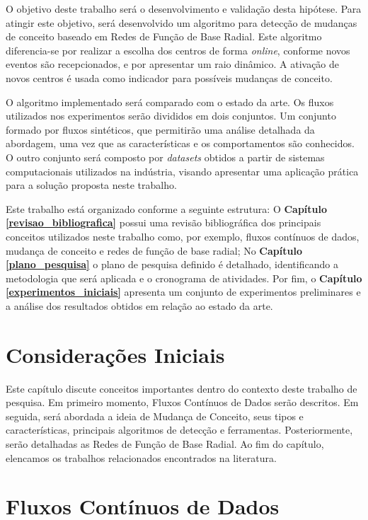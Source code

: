 \documentclass[qual, classic, a4paper]{ufbathesis}
\begin{document}
O objetivo deste trabalho será o desenvolvimento e validação desta hipótese.
Para atingir este objetivo, será desenvolvido um algoritmo para detecção de mudanças de conceito baseado em Redes de Função de Base Radial. 
Este algoritmo diferencia-se por realizar a escolha dos centros de forma \textit{online}, conforme novos eventos são recepcionados, 
e por apresentar um raio dinâmico. 
A ativação de novos centros é usada como indicador para possíveis mudanças de conceito.

O algoritmo implementado será comparado com o estado da arte. 
Os fluxos utilizados nos experimentos serão divididos em dois conjuntos. 
Um conjunto formado por fluxos sintéticos, que permitirão uma análise detalhada da abordagem, uma vez que as características e os comportamentos são conhecidos. 
O outro conjunto será composto por \textit{datasets} obtidos a partir de sistemas computacionais utilizados na indústria,
visando apresentar uma aplicação prática para a solução proposta neste trabalho.


Este trabalho está organizado conforme a seguinte estrutura: 
O \textbf{Capítulo \ref{revisao_bibliografica}} possui uma revisão bibliográfica dos principais conceitos utilizados neste trabalho como, 
por exemplo, fluxos contínuos de dados, mudança de conceito e redes de função de base radial; 
No \textbf{Capítulo \ref{plano_pesquisa}} o plano de pesquisa definido é detalhado, 
identificando a metodologia que será aplicada e o cronograma de atividades. 
Por fim, o \textbf{Capítulo \ref{experimentos_iniciais}} 
apresenta um conjunto de experimentos preliminares e a análise dos resultados obtidos em relação ao estado da arte.

 \label{revisao_bibliografica}
\section{Considerações Iniciais}

Este capítulo discute conceitos importantes dentro do contexto deste trabalho de pesquisa.
Em primeiro momento, Fluxos Contínuos de Dados serão descritos.
Em seguida, será abordada a ideia de Mudança de Conceito, seus tipos e características, principais algoritmos de detecção e ferramentas.
Posteriormente, serão detalhadas as Redes de Função de Base Radial.
Ao fim do capítulo, elencamos os trabalhos relacionados encontrados na literatura.


\section{Fluxos Contínuos de Dados}
\end{document}
